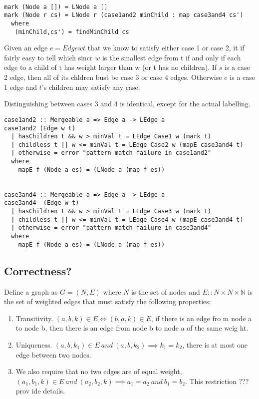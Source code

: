 \documentclass{jfp}
\begin{document}
\begin{verbatim}

mark (Node a []) = LNode a []
mark (Node r cs) = LNode r (case1and2 minChild : map case3and4 cs')
  where
   (minChild,cs') = findMinChild cs

\end{verbatim}

Given an edge $e = Edge w t$ that we know to satisfy either case 1 or case 2, it if fairly easy to tell which sincr $w$ is the smallest edge from t if and only if each edge to a child of t has weight larger than w (or t has no children).
If $s$ is a case 2 edge, then all of its chldren bust be case 3 or case 4 edges.
Otherwise $e$ is a case 1 edge and $t$'s children may satisfy any case.

Distinguishing between cases 3 and 4 is identical, except for the actual labelling.

\begin{verbatim}
case1and2 :: Mergeable a => Edge a -> LEdge a
case1and2 (Edge w t)
  | hasChildren t && w > minVal t = LEdge Case1 w (mark t)
  | childless t || w <= minVal t = LEdge Case2 w (mapE case3and4 t)
  | otherwise = error "pattern match failure in case1and2"
  where
    mapE f (Node a es) = (LNode a (map f es))


case3and4 :: Mergeable a => Edge a -> LEdge a
case3and4  (Edge w t)
  | hasChildren t && w > minVal t = LEdge Case3 w (mark t)
  | childless t || w <= minVal t = LEdge Case4 w (mapE case3and4 t)
  | otherwise = error "pattern match failure in case3and4"
  where
    mapE f (Node a es) = (LNode a (map f es))
\end{verbatim}

\subsection{Correctness?}

Define a graph as $G = (N,E)$
where $N$ is the set of nodes and $E :: N\times N \times \mathbb{N}$ is the set 
of weighted edges
that must satisfy the following properties:
\begin{enumerate}
\item Transitivity. $(a,b,k) \in E  \iff (b,a,k) \in E$, if there is an edge fro
m node a to node b, then there is an edge from node b to node a of the same weig
ht.
\item Uniqueness.   $(a,b,k_1) \in E\ and\ (a,b,k_2) \implies k_1 = k_2$, there 
is at most one edge between two nodes.
\item We also require that no two edges are of equal weight, $(a_1,b_1,k) \in E\
 and\ (a_2,b_2,k) \implies a_1 = a_2\ and\ b_1 = b_2$. This restriction ??? prov
ide details.

\end{enumerate}
\end{document}
